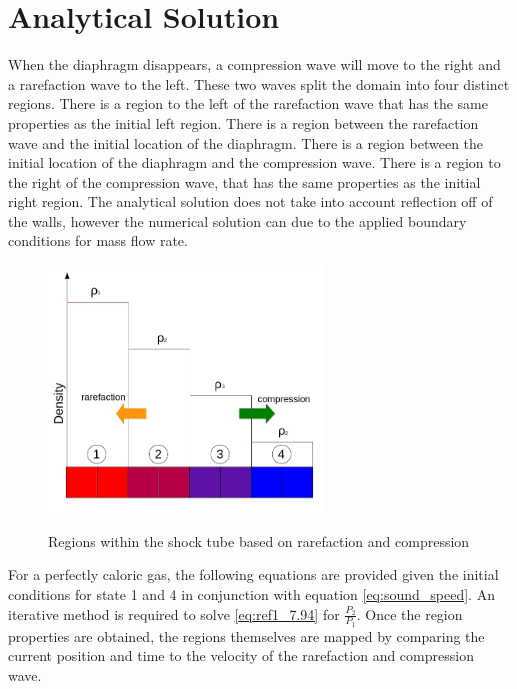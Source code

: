    \section{Analytical Solution}
    
    When the diaphragm disappears, a compression wave will move to the right and a
    rarefaction wave to the left. These two waves split the domain into four
    distinct regions. There is a region to the left of the rarefaction wave that has
    the same properties as the initial left region. There is a region between the
    rarefaction wave and the initial location of the diaphragm. There is a region
    between the initial location of the diaphragm and the compression wave. There is
    a region to the right of the compression wave, that has the same properties
    as the initial right region. The analytical solution does not take into
    account reflection off of the walls, however the numerical solution can due
    to the applied boundary conditions for mass flow rate.
    
    \begin{figure}[!h]
    	\centering
    	\includegraphics[width=0.65\textwidth]{images/Shock_Tube/Shock_Tube_regions}
    	\label{fig:V2_pressure_scaling}
    	\caption{Regions within the shock tube based on rarefaction and compression}
    \end{figure}
    
    For a perfectly caloric gas, the following equations are provided
    \cite[p. 238]{Anderson1990} given the initial conditions for state 1 and
    4 in conjunction with equation \ref{eq:sound_speed}. An iterative method is
    required to solve \ref{eq:ref1_7.94} for $\frac{P_{2}}{P_{1}}$. Once the region
    properties are obtained, the regions themselves are mapped by comparing the
    current position and time to the velocity of the rarefaction and compression
    wave. 
    
